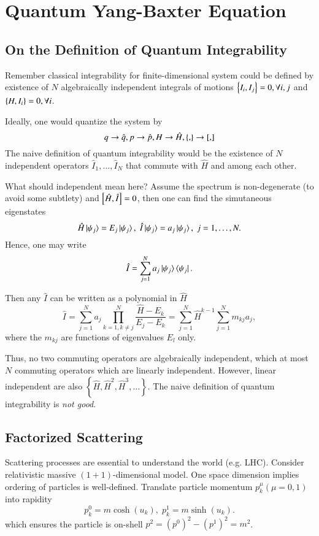\chapter{Quantum Yang-Baxter Equation}
\section{On the Definition of Quantum Integrability}
Remember classical integrability for finite-dimensional system could be defined by existence of $N$ algebraically independent integrals of motions $\pb{I_i}{I_j} = 0, \forall i, j$ and $\pb{H}{I_i} = 0, \forall i$.

Ideally, one would quantize the system by
\begin{equation*}
	q \rightarrow \hat{q}, p \rightarrow \hat{p}, H \rightarrow \hat{H}, \pb{}{} \rightarrow \comm{}{}
\end{equation*}
The naive definition of quantum integrability would be the existence of $N$ independent operators $\hat{I}_1, \dots, \hat{I}_N$ that commute with $\hat{H}$ and among each other.

What should independent mean here? Assume the spectrum is non-degenerate (to avoid some subtlety) and $\comm{\hat{H}}{\hat{I}} = 0$, then one can find the simutaneous eigenstates
\begin{equation*}
	\hat{H} \ket{\psi_j} = E_j \ket{\psi_j}, \;
	\hat{I} \ket{\psi_j} = a_j \ket{\psi_j}, \;
	j = 1, \dots, N.
\end{equation*}
Hence, one may write
\begin{equation*}
	\hat{I} = \sum_{j=1}^N a_j \ket{\psi_j} \bra{\psi_j}	.
\end{equation*}

Then any $\hat{I}$ can be written as a polynomial in $\hat{H}$
\begin{equation*}
	\hat{I} = \sum_{j=1}^N a_j \prod_{k=1, k\neq j }^N \frac{\hat{H} - E_k}{E_j - E_k} = \sum_{j=1}^N \hat{H}^{k-1} \sum_{j=1}^N m_{kj} a_j,
\end{equation*}
where the $m_{kj}$ are functions of eigenvalues $E_l$ only.

Thus, no two commuting operators are algebraically independent, which at most $N$ commuting operators  which are linearly independent. However, linear independent are also $\left\{ \hat{H}, \hat{H}^2, \hat{H}^3, \dots \right\} $. The naive definition of quantum integrability is \textit{not good}.

\section{Factorized Scattering}
Scattering processes are essential to understand the world (e.g. LHC). Consider relativistic massive $(1+1)$-dimensional model. One space dimension implies ordering of particles is well-defined. Translate particle momentum $p^\mu_k (\mu = 0, 1)$ into rapidity
\begin{equation}
	p_k^0 = m \cosh(u_k),\;
	p_k^1 = m \sinh(u_k).
\end{equation}
which ensures the particle is on-shell $p^2 = (p^0)^2 - (p^1)^2 = m^2$.

